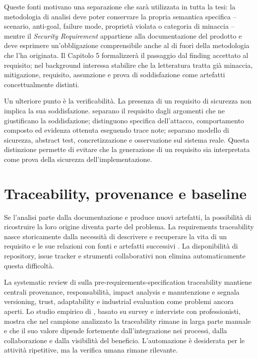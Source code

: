 \documentclass[12pt,a4paper,oneside]{report}
\newcommand{\securityrequirement}{\textit{Security Requirement}}
\begin{document}
Queste fonti motivano una separazione che sarà utilizzata in tutta la tesi: la metodologia di analisi deve poter conservare la propria semantica specifica -- scenario, anti-goal, failure mode, proprietà violata o categoria di minaccia -- mentre il \securityrequirement{} appartiene alla documentazione del prodotto e deve esprimere un'obbligazione comprensibile anche al di fuori della metodologia che l'ha originata. Il Capitolo 5 formalizzerà il passaggio dal finding accettato al requisito; nel background interessa stabilire che la letteratura tratta già minaccia, mitigazione, requisito, assunzione e prova di soddisfazione come artefatti concettualmente distinti.

Un ulteriore punto è la verificabilità. La presenza di un requisito di sicurezza non implica la sua soddisfazione. \citet{haley2008securityrequirements} separano il requisito dagli argomenti che ne giustificano la soddisfazione; \citet{whittle2008executable} distinguono specifica dell'attacco, comportamento composto ed evidenza ottenuta eseguendo trace note; \citet{lonetti2023mbstiot} separano modello di sicurezza, abstract test, concretizzazione e osservazione sul sistema reale. Questa distinzione permette di evitare che la generazione di un requisito sia interpretata come prova della sicurezza dell'implementazione.

\section{Traceability, provenance e baseline}

Se l'analisi parte dalla documentazione e produce nuovi artefatti, la possibilità di ricostruire la loro origine diventa parte del problema. La requirements traceability nasce storicamente dalla necessità di descrivere e recuperare la vita di un requisito e le sue relazioni con fonti e artefatti successivi \citep{gotel1994analysis}. La disponibilità di repository, issue tracker e strumenti collaborativi non elimina automaticamente questa difficoltà.

La systematic review di \citet{mucha2024prers} sulla pre-requirements-specification traceability mantiene centrali provenance, responsabilità, impact analysis e manutenzione e segnala versioning, trust, adaptability e industrial evaluation come problemi ancora aperti. Lo studio empirico di \citet{ruiz2023whydontwetrace}, basato su survey e interviste con professionisti, mostra che nel campione analizzato la traceability rimane in larga parte manuale e che il suo valore dipende fortemente dall'integrazione nei processi, dalla collaborazione e dalla visibilità del beneficio. L'automazione è desiderata per le attività ripetitive, ma la verifica umana rimane rilevante.
\end{document}
